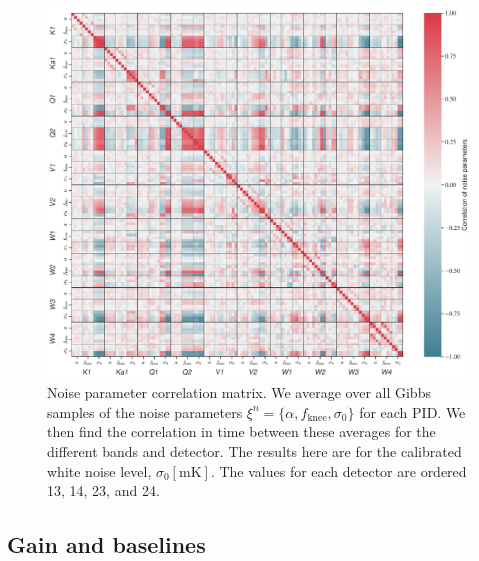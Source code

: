 \documentclass[twocolumn]{../../common/aa}
\begin{document}

\begin{figure}[t]
	\centering
	\includegraphics[width=\textwidth]{figures/noise_parameter_correlation.pdf}
	\caption{Noise parameter correlation matrix. We average over all Gibbs samples of the noise parameters $\xi^n=\{\alpha,f_\mathrm{knee},\sigma_0\}$ for each PID. We then find the correlation in time between these averages for the different bands and detector. The results here are for the calibrated white noise level, $\sigma_0[\mathrm{mK}]$. The values for each detector are ordered 13, 14, 23, and 24.}
	\label{fig:correlation}
\end{figure}




\subsection{Gain and baselines}
\label{sec:gain}
\end{document}
